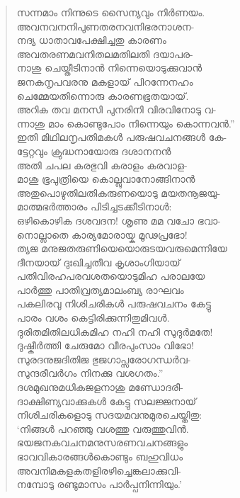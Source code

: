 \begin{verse}
സന്നമാം നിന്നുടെ സൈന്യവും നിര്‍ണയം.\\
അവനവനനിപുണതരനവനിഭരനാശന-\\
നദ്യ ധാതാവപേക്ഷിച്ചതു കാരണം\\
അവതരണമവനിതലമതിലതി ദയാപര-\\
നാശു ചെയ്തീടിനാന്‍ നിന്നെയൊടുക്കുവാന്‍\\
ജനകനൃപവരനു മകളായ് പിറന്നേനഹം\\
ചെമ്മേയതിന്നൊരു കാരണഭൂതയായ്.\\
അറിക തവ മനസി പുനരിനി വിരവിനോടു വ-\\
ന്നാശു മാം കൊണ്ടുപോം നിന്നെയും കൊന്നവന്‍.”\\
ഇതി മിഥിലനൃപതിമകള്‍ പരുഷവചനങ്ങള്‍ കേ-\\
ട്ടേറ്റവും ക്രുദ്ധനായോരു ദശാനനന്‍\\
അതി ചപല കരഭുവി കരാളം കരവാള-\\
മാശു ഭൂപുത്രിയെ കൊല്ലുവാനോങ്ങിനാന്‍\\
അതുപൊഴുതിലതികരുണയൊടു മയതനൂജയു-\\
മാത്മഭര്‍ത്താരം പിടിച്ചടക്കീടിനാള്‍:\\
ഒഴികൊഴിക ദശവദന! ശൃണു മമ വചോ ഭവാ-\\
നൊല്ലാതെ കാര്യമോരായ്ക മൂഢപ്രഭോ!\\
ത്യജ മനുജതരുണിയെയൊരുടയവരുമെന്നിയേ\\
ദീനയായ് ദുഃഖിച്ചതീവ കൃശാംഗിയായ്\\
പതിവിരഹപരവശതയൊടുമിഹ പരാലയേ\\
പാര്‍ത്തു പാതിവ്രത്യമാലംബ്യ രാഘവം\\
പകലിരവു നിശിചരികള്‍ പരുഷവചനം കേട്ടു\\
പാരം വശം കെട്ടിരിക്കുന്നിതുമിവള്‍.\\
ദുരിതമിതിലധികമിഹ നഹി നഹി സുദുര്‍മതേ!\\
ദുഷ്കീര്‍ത്തി ചേരുമോ വീരപുംസാം വിഭോ!\\
സുരദനുജദിതിജ ഭുജഗാപ്സരോഗന്ധര്‍വ-\\
സുന്ദരീവര്‍ഗം നിനക്കു വശഗതം.”\\
ദശമുഖനുമധികജളനാശു മണ്ഡോദരീ-\\
ദാക്ഷിണ്യവാക്കുകള്‍ കേട്ടു സലജ്ജനായ്\\
നിശിചരികളൊടു സദയമവനുമുരചെയ്തിതു:\\
‘നിങ്ങള്‍ പറഞ്ഞു വശത്തു വരുത്തുവിന്‍.\\
ഭയജനകവചനമനുസരണവചനങ്ങളും\\
ഭാവവികാരങ്ങള്‍കൊണ്ടും ബഹുവിധം\\
അവനിമകളകതളിരഴിച്ചെങ്കലാക്കുവി-\\
നമ്പോടു രണ്ടുമാസം പാര്‍പ്പനിന്നിയും.’\\

\end{verse}
